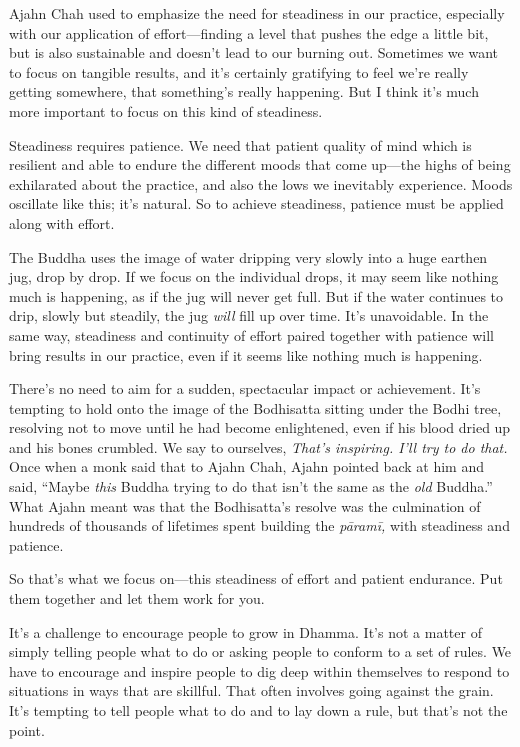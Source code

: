 
Ajahn Chah used to emphasize the need for steadiness in our practice, 
especially with our application of effort---finding a level that pushes 
the edge a little bit, but is also sustainable and doesn't lead to our 
burning out. Sometimes we want to focus on tangible results, and it's 
certainly gratifying to feel we're really getting somewhere, that 
something's really happening. But I think it's much more important to 
focus on this kind of steadiness.

Steadiness requires patience. We need that patient quality of mind 
which is resilient and able to endure the different moods that come 
up---the highs of being exhilarated about the practice, and also the 
lows we inevitably experience. Moods oscillate like this; it's natural. 
So to achieve steadiness, patience must be applied along with effort.

The Buddha uses the image of water dripping very slowly into a huge 
earthen jug, drop by drop. If we focus on the individual drops, it may 
seem like nothing much is happening, as if the jug will never get full. 
But if the water continues to drip, slowly but steadily, the jug 
\emph{will} fill up over time. It's unavoidable. In the same way, 
steadiness and continuity of effort paired together with patience will 
bring results in our practice, even if it seems like nothing much is 
happening.

There's no need to aim for a sudden, spectacular impact or achievement. 
It's tempting to hold onto the image of the Bodhisatta sitting under 
the Bodhi tree, resolving not to move until he had become enlightened, 
even if his blood dried up and his bones crumbled. We say to ourselves, 
\emph{That's inspiring. I'll try to do that.} Once when a monk said 
that to Ajahn Chah, Ajahn pointed back at him and said, ``Maybe 
\emph{this} Buddha trying to do that isn't the same as the \emph{old} 
Buddha.'' What Ajahn meant was that the Bodhisatta's resolve was the 
culmination of hundreds of thousands of lifetimes spent building the 
\emph{pāramī,} with steadiness and patience.

So that's what we focus on---this steadiness of effort and patient 
endurance. Put them together and let them work for you.


It's a challenge to encourage people to grow in Dhamma. It's not a 
matter of simply telling people what to do or asking people to conform 
to a set of rules. We have to encourage and inspire people to dig deep 
within themselves to respond to situations in ways that are skillful. 
That often involves going against the grain. It's tempting to tell 
people what to do and to lay down a rule, but that's not the point.


